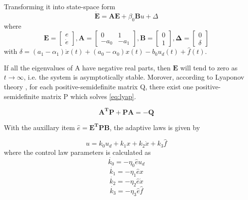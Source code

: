 Transforming it into state-space form
\begin{equation}
  \label{eq:refmodel}
  \mathbf{\dot{E} = AE} + \beta_0\mathbf{B}u + \Delta
\end{equation}
where
\begin{equation}
  \label{eq:matrices}
  \mathbf{E} =
    \begin{bmatrix}
       e\\[0.3em]
       \dot{e}
     \end{bmatrix},
  \mathbf{A} =
    \begin{bmatrix}
       0 & 1\\[0.3em]
       -a_0 & -a_1
     \end{bmatrix},
  \mathbf{B} =
    \begin{bmatrix}
        0\\[0.3em]
        1
    \end{bmatrix},
    \mathbf{\Delta} =
      \begin{bmatrix}
          0\\[0.3em]
          \delta
      \end{bmatrix}
\end{equation}
with $\delta = (a_1-\alpha_1)\dot{x}(t) + (a_0-\alpha_0)x(t) - b_0u_d(t) + \hat{f}(t)$.

If all the eigenvalues of A have negative real parts, then $\mathbf{E}$ will tend to zero as  $t \to \infty$, i.e. the system is asymptotically stable. Morover, according to Lyaponov  theory \cite{Ljung:2003}, for each positive-semidefinite matrix Q, there exist one positive-semidefinite matrix P which solves \eqref{eq:lyap}.

\begin{equation}
  \label{eq:lyap}
  \mathbf{A^TP + PA = -Q}
\end{equation}

With the auxillary item $\hat{e} = \mathbf{E^TPB}$, the adaptive laws is given by

\begin{equation}
  \label{eq:adaplaws}
  u = k_0u_d + k_1x + k_2\dot{x} + k_3\hat{f}
\end{equation}
where the control law parameters is calculated as
\begin{equation}
  \label{eq:adaplaws1}
  \dot{k_0} = -\eta_0\hat{e}u_d
\end{equation}
\begin{equation}
  \label{eq:adaplaws2}
  \dot{k_1} = -\eta_1\hat{e}x
\end{equation}
\begin{equation}
  \label{eq:adaplaws3}
  \dot{k_2} = -\eta_2\hat{e}\dot{x}
\end{equation}
\begin{equation}
  \label{eq:adaplaws4}
  \dot{k_3} = -\eta_3\hat{e}\hat{f}
\end{equation}

